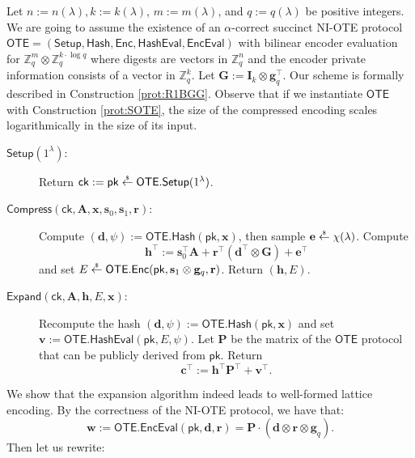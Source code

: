 \documentclass{article}
\newcommand{\getsr}{\overset{\raisebox{-1pt}{$\scriptscriptstyle \$$}}{\gets}}
\newcommand{\sample}{\getsr}
\newcommand{\OTE}{\mathsf{OTE}}
\newcommand{\Z}{\mathbb{Z}}
\renewcommand{\sec}{\ensuremath{\lambda}}
\newcommand{\secpar}{\sec}
\newcommand{\Compress}{\mathsf{Compress}}
\newcommand{\ck}{\mathsf{ck}}
\newcommand{\algofont}[1]{\ensuremath{\mathsf{#1}}}
\newcommand{\Enc}{{\algofont{Enc}}}
\newcommand{\Setup}{{\algofont{Setup}}}
\newcommand{\Eval}{\algofont{Eval}\xspace}
\newcommand{\Hash}{{\algofont{Hash}}}
\newcommand{\Expand}{\algofont{Expand}}
\newcommand{\id}{\ensuremath{\mathbf{I}}}
\newcommand{\pk}{{\mathsf{pk}}}
\newcommand\bbbone{1}
\newenvironment{protocol}[1][]
{\begin{algorithm}\caption{#1}}
  {\end{algorithm}}
\begin{document}
Let $n:=n(\sec), k:=k(\sec)$, $m:=m(\sec)$, and $q:=q(\sec)$ be positive integers. We are going to assume the existence of an $\alpha$-correct succinct NI-OTE protocol $\OTE=(\Setup, \allowbreak\Hash, \allowbreak\Enc, \allowbreak\Hash\Eval, \allowbreak\Enc\Eval)$ with bilinear encoder evaluation for $\Z_q^{m}\otimes\Z_q^{k\cdot\log q}$ where digests are vectors in $\Z_q^n$ and the encoder private information consists of a vector in $\Z_q^k$. Let $\mathbf{G}:=\id_k\otimes \mathbf{g}_q^\intercal$. Our scheme is formally described in Construction \ref{prot:R1BGG}. Observe that if we instantiate $\OTE$ with Construction \ref{prot:SOTE}, the size of the compressed encoding scales logarithmically in the size of its input.



\begin{protocol}[Compression of Lattice Encodings]\label{prot:R1BGG}

\begin{description}
\item[$\Setup(1^\secpar)$:] Return $\ck:= \pk\sample \OTE.\Setup(\bbbone^\sec)$.

\item[$\Compress(\ck, \mathbf{A}, \mathbf{x}, \mathbf{s}_0, \mathbf{s}_1, \mathbf{r})$:]  Compute $(\mathbf{d}, \psi) := \OTE.\Hash(\pk, \mathbf{x})$, then sample $\mathbf{e}\sample\chi(\sec)$. Compute
\[
\mathbf{h}^\intercal:= \mathbf{s}_0^\intercal \mathbf{A}+\mathbf{r}^\intercal (\mathbf{d}^\intercal \otimes \mathbf{G})+\mathbf{e}^\intercal
\]
and set $E\sample \OTE.\Enc(\pk, \mathbf{s}_1\otimes \mathbf{g}_q, \mathbf{r})$. Return 
$(\mathbf{h}, E)$.

 \item[$\Expand(\ck, \mathbf{A}, \mathbf{h}, E, \mathbf{x})$:] Recompute the hash 
 $(\mathbf{d}, \psi) := \OTE.\Hash(\pk, \mathbf{x})$ and set $\mathbf{v}:=\OTE.\Hash\Eval(\pk, E, \psi)$. Let $\mathbf{P}$ be the matrix of the $\OTE$ protocol that can be publicly derived from $\pk$. Return
 \[
 \mathbf{c}^\intercal:=\mathbf{h}^\intercal \mathbf{P}^\intercal+\mathbf{v}^\intercal.
 \]
\end{description}
\end{protocol}
We show that the expansion algorithm indeed leads to well-formed lattice encoding. By the correctness of the NI-OTE protocol, we have that:
\[
\mathbf{w}:=\OTE.\Enc\Eval(\pk, \mathbf{d}, \mathbf{r})=\mathbf{P}\cdot(\mathbf{d} \otimes \mathbf{r}\otimes \mathbf{g}_q).
\]
Then let us rewrite:
\end{document}
